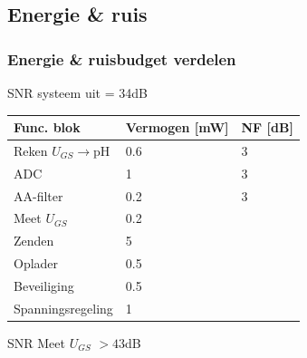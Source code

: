     \subsection*{Energie \& ruis}
    \begin{frame}
        \frametitle{Energie \& ruisbudget verdelen}

        SNR systeem uit = 34dB
    
        \begin{table}
            \centering
            \begin{tabular}{l|l|l}
                Func. blok          & Vermogen [mW] & NF [dB]   \\\hline
                Reken $U_{GS}\rightarrow$pH & 0.6   & 3         \\
                ADC                 & 1             & 3         \\
                AA-filter           & 0.2           & 3         \\
                Meet $U_{GS}$       & 0.2           &           \\\hline
                Zenden              & 5             &           \\\hline
                Oplader             & 0.5           &           \\
                Beveiliging         & 0.5           &           \\
                Spanningsregeling   & 1             &           \\ 
            \end{tabular}
        \end{table}

        \pause

        SNR Meet $U_{GS}$  $>43$dB
    
    \end{frame}